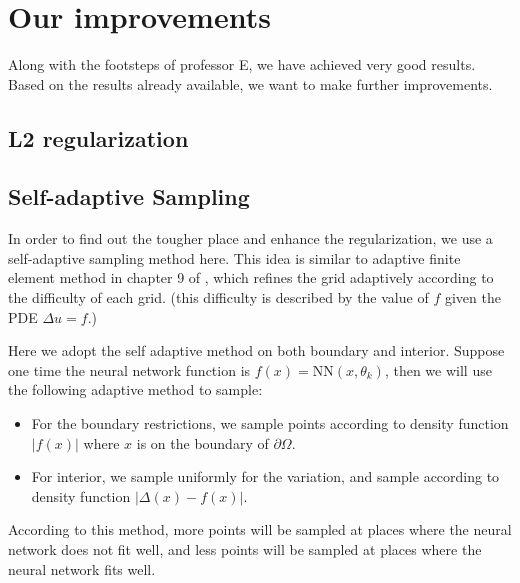 \documentclass{article}
\begin{document}
\section{Our improvements}
\par Along with the footsteps of professor E, we have achieved very good results. Based on the results already available, we want to make further improvements. 

\subsection{L2 regularization}

\subsection{Self-adaptive Sampling}
\par In order to find out the tougher place and enhance the regularization, we use a self-adaptive sampling method here. This idea is similar to adaptive finite element method in chapter 9 of \cite{brenner2007mathematical}, which refines the grid adaptively according to the difficulty of each grid. (this difficulty is described by the value of $f$ given the PDE $\Delta u = f$.) 
\par Here we adopt the self adaptive method on both boundary and interior. Suppose one time the neural network function is $f(x) = \mathrm{NN}(x, \theta_k)$, then we will use the following adaptive method to sample:
\begin{itemize}
	\item For the boundary restrictions, we sample points according to density function $|f(x)|$ where $x$ is on the boundary of $\partial\Omega$.
	\item For interior, we sample uniformly for the variation, and sample according to density function $|\Delta(x) - f(x)|$.
\end{itemize}
\par  According to this method, more points will be sampled at places where the neural network does not fit well, and less points will be sampled at places where the neural network fits well. 
\end{document}
